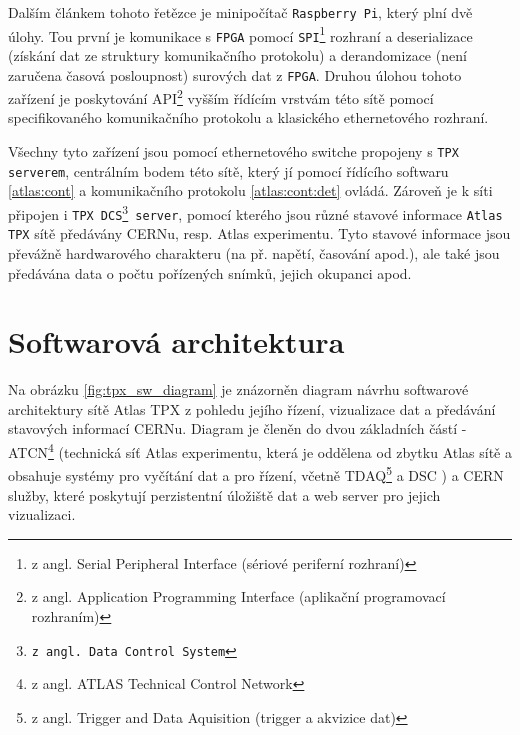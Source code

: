 Dalším článkem tohoto řetězce je minipočítač \texttt{Raspberry Pi}, který plní dvě úlohy. Tou první je komunikace s \texttt{FPGA} pomocí \texttt{SPI}\footnote{z angl. Serial Peripheral Interface (sériové periferní rozhraní)} rozhraní a deserializace (získání dat ze struktury komunikačního protokolu) a derandomizace (není zaručena časová posloupnost) surových dat z \texttt{FPGA}. Druhou úlohou tohoto zařízení je poskytování API\footnote{z angl. Application Programming Interface (aplikační programovací rozhraním)} vyšším řídícím vrstvám této sítě pomocí specifikovaného komunikačního protokolu a klasického ethernetového rozhraní.

Všechny tyto zařízení jsou pomocí ethernetového switche propojeny s \texttt{TPX serverem}, centrálním bodem této sítě, který jí pomocí řídícího softwaru \ref{atlas:cont} a komunikačního protokolu \ref{atlas:cont:det} ovládá. Zároveň je k síti připojen i \texttt{TPX DCS\footnote{z angl. Data Control System} server}, pomocí kterého jsou různé stavové informace \texttt{Atlas TPX} sítě předávány CERNu, resp. Atlas experimentu. Tyto stavové informace jsou převážně hardwarového charakteru (na př. napětí, časování apod.), ale také jsou předávána data o počtu pořízených snímků, jejich okupanci apod.

\section{Softwarová architektura}\label{atlas:sw_arch}
Na obrázku \ref{fig:tpx_sw_diagram} je znázorněn diagram návrhu softwarové architektury sítě Atlas TPX z pohledu jejího řízení, vizualizace dat a předávání stavových informací CERNu. Diagram je členěn do dvou základních částí - ATCN\footnote{z angl. ATLAS Technical Control Network} (technická síť Atlas experimentu, která je oddělena od zbytku Atlas sítě a obsahuje systémy pro vyčítání dat a pro řízení, včetně TDAQ\footnote{z angl. Trigger and Data Aquisition (trigger a akvizice dat)} a DSC \cite{Ballestrero:atlas_network_upgrade}) a CERN služby, které poskytují perzistentní úložiště dat a web server pro jejich vizualizaci.


